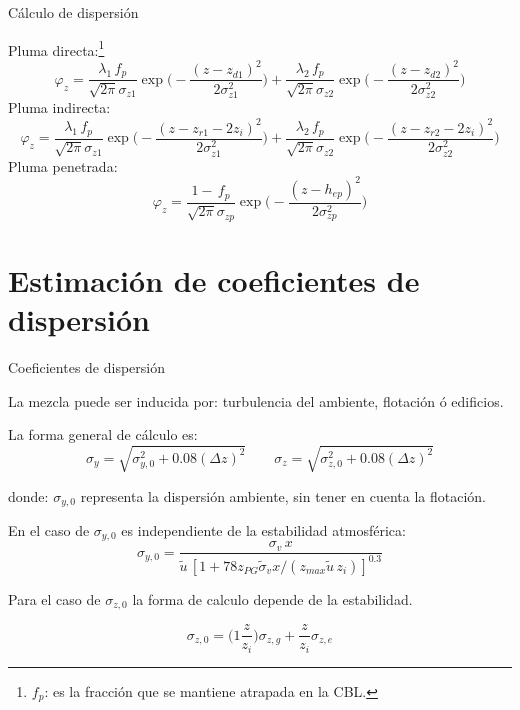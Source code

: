  \begin{frame}{Cálculo de dispersión}{}
     
     Pluma \alert{directa}:\footnote{$f_p$: es la fracción que se mantiene atrapada en la CBL.}
$$
 \varphi_z = 
 \dfrac{\lambda_1\,f_p}{\sqrt{2\pi}\sigma_{z1}}\exp{\bigg(-\dfrac{(z-z_{d1})^2}{2\sigma_{z1}^2}\bigg)}  + 
 \dfrac{\lambda_2\,f_p}{\sqrt{2\pi}\sigma_{z2}}\exp{\bigg(-\dfrac{(z-z_{d2})^2}{2\sigma_{z2}^2}\bigg)} 
$$
     Pluma \alert{indirecta}:
$$
 \varphi_z = 
 \dfrac{\lambda_1\,f_p}{\sqrt{2\pi}\sigma_{z1}}\exp{\bigg(-\dfrac{(z-z_{r1}-2z_i)^2}{2\sigma_{z1}^2}\bigg)}  + 
 \dfrac{\lambda_2\,f_p}{\sqrt{2\pi}\sigma_{z2}}\exp{\bigg(-\dfrac{(z-z_{r2}-2z_i)^2}{2\sigma_{z2}^2}\bigg)} 
$$
     Pluma \alert{penetrada}:
$$
 \varphi_z = 
 \dfrac{1-\,f_p}{\sqrt{2\pi}\sigma_{zp}}\exp{\bigg(-\dfrac{(z-h_{ep})^2}{2\sigma_{zp}^2}\bigg)}
$$ 
\end{frame}


\section{Estimación de coeficientes de dispersión}

\begin{frame}{Coeficientes de dispersión}
 
 La mezcla puede ser inducida por: \alert{turbulencia del ambiente}, \alert{flotación} ó \alert{edificios}.

La forma general de cálculo es:
$$
\sigma_y = \sqrt{\sigma^2_{y,0} + 0.08 (\Delta z)^2 } \qquad \sigma_z = \sqrt{\sigma^2_{z,0} + 0.08 (\Delta z)^2 }
$$

donde: $\sigma_{y,0}$ representa la dispersión ambiente, sin tener en cuenta la flotación.

En el caso de $\sigma_{y,0}$ es independiente de la estabilidad atmosférica:
$$
\sigma_{y,0}=\dfrac{\sigma_v \, x}{\tilde{u}\, [ 1+78z_{PG}\tilde{\sigma}_v x / (z_{max}\tilde{u}\,z_i) ]^{0.3} }
$$   

Para el caso de $\sigma_{z,0}$ la forma de calculo depende de la estabilidad.

$$
\sigma_{z,0} = \bigg(1\dfrac{z}{z_i}\bigg)\sigma_{z,g} + \dfrac{z}{z_i} \sigma_{z,e}
$$

\end{frame}




